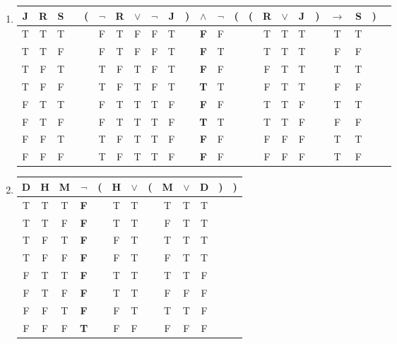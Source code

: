 \begin{enumerate}
\item
\begin{tabular}{@{ }c@{ }@{ }c@{ }@{ }c | c@{ }@{}c@{}@{ }c@{ }@{ }c@{ }@{ }c@{ }@{ }c@{ }@{ }c@{ }@{}c@{}@{ }c@{ }@{ }c@{ }@{}c@{}@{}c@{}@{ }c@{ }@{ }c@{ }@{ }c@{ }@{}c@{}@{ }c@{ }@{ }c@{ }@{}c@{}@{ }c}
J & R & S &  & ( & $\lnot$ & R & $\lor$ & $\lnot$ & J & ) & $\land$ & $\lnot$ & ( & ( & R & $\lor$ & J & ) & $\rightarrow$ & S & ) & \\
\hline
T & T & T &  &  & F & T & F & F & T &  & \textbf{F} & F &  &  & T & T & T &  & T & T &  & \\
T & T & F &  &  & F & T & F & F & T &  & \textbf{F} & T &  &  & T & T & T &  & F & F &  & \\
T & F & T &  &  & T & F & T & F & T &  & \textbf{F} & F &  &  & F & T & T &  & T & T &  & \\
T & F & F &  &  & T & F & T & F & T &  & \textbf{T} & T &  &  & F & T & T &  & F & F &  & \\
F & T & T &  &  & F & T & T & T & F &  & \textbf{F} & F &  &  & T & T & F &  & T & T &  & \\
F & T & F &  &  & F & T & T & T & F &  & \textbf{T} & T &  &  & T & T & F &  & F & F &  & \\
F & F & T &  &  & T & F & T & T & F &  & \textbf{F} & F &  &  & F & F & F &  & T & T &  & \\
F & F & F &  &  & T & F & T & T & F &  & \textbf{F} & F &  &  & F & F & F &  & T & F &  & \\
\end{tabular}

\item
\begin{tabular}{@{ }c@{ }@{ }c@{ }@{ }c | c@{ }@{}c@{}@{ }c@{ }@{ }c@{ }@{}c@{}@{ }c@{ }@{ }c@{ }@{ }c@{ }@{}c@{}@{}c@{ }}
D & H & M & $\lnot$ & ( & H & $\lor$ & ( & M & $\lor$ & D & ) & )\\
\hline
T & T & T & \textbf{F} &  & T & T &  & T & T & T &  & \\
T & T & F & \textbf{F} &  & T & T &  & F & T & T &  & \\
T & F & T & \textbf{F} &  & F & T &  & T & T & T &  & \\
T & F & F & \textbf{F} &  & F & T &  & F & T & T &  & \\
F & T & T & \textbf{F} &  & T & T &  & T & T & F &  & \\
F & T & F & \textbf{F} &  & T & T &  & F & F & F &  & \\
F & F & T & \textbf{F} &  & F & T &  & T & T & F &  & \\
F & F & F & \textbf{T} &  & F & F &  & F & F & F &  & \\
\end{tabular}


\end{enumerate}
